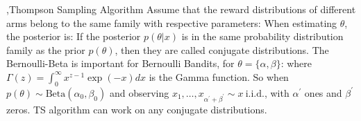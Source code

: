 \documentclass[12pt]{report}
\begin{document}
\sep{Thompson Sampling Algorithm}
Assume that the reward distributions of different arms belong to the same family with respective parameters:
When estimating $\theta$, the posterior is:
If the posterior $p(\theta|x)$ is in the same probability distribution family as the prior $p(\theta)$, then they are called conjugate distributions.
The Bernoulli-Beta is important for Bernoulli Bandits, for $\theta=\{\alpha,\beta\}$:
where $\Gamma(z)=\int_{0}^{\infty}x^{z-1}\exp(-x)dx$ is the Gamma function. So when $p(\theta)\sim\mathrm{Beta}(\alpha_{0},\beta_{0})$ and
observing $x_1,\ldots,x_{\alpha^{\prime}+\beta^{\prime}}\sim x\mathrm{~i.i.d.}$, with $\alpha^\prime$ ones and $\beta^\prime$ zeros.
TS algorithm can work on any conjugate distributions.
\end{document}
